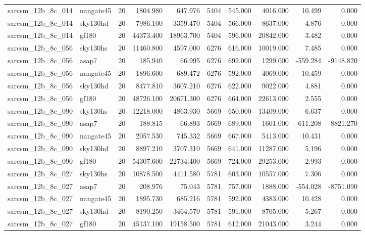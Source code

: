 \begin{tabular}{llrrrrrrrr}
sarcsm\_12b\_8c\_014 & nangate45 & 20 & 1804.980 & 647.976 & 5404 & 545.000 & 4016.000 & 10.499 & 0.000 \\
sarcsm\_12b\_8c\_014 & sky130hd & 20 & 7986.100 & 3359.470 & 5404 & 566.000 & 8637.000 & 4.876 & 0.000 \\
sarcsm\_12b\_8c\_014 & gf180 & 20 & 44373.400 & 18963.700 & 5404 & 596.000 & 20842.000 & 3.482 & 0.000 \\
sarcsm\_12b\_8c\_056 & sky130hs & 20 & 11460.800 & 4597.000 & 6276 & 616.000 & 10019.000 & 7.485 & 0.000 \\
sarcsm\_12b\_8c\_056 & asap7 & 20 & 185.940 & 66.995 & 6276 & 692.000 & 1299.000 & -559.284 & -9148.820 \\
sarcsm\_12b\_8c\_056 & nangate45 & 20 & 1896.600 & 689.472 & 6276 & 592.000 & 4069.000 & 10.459 & 0.000 \\
sarcsm\_12b\_8c\_056 & sky130hd & 20 & 8477.810 & 3607.210 & 6276 & 622.000 & 9022.000 & 4.881 & 0.000 \\
sarcsm\_12b\_8c\_056 & gf180 & 20 & 48726.100 & 20671.300 & 6276 & 664.000 & 22613.000 & 2.555 & 0.000 \\
sarcsm\_12b\_8c\_090 & sky130hs & 20 & 12218.000 & 4863.930 & 5669 & 650.000 & 13409.000 & 6.637 & 0.000 \\
sarcsm\_12b\_8c\_090 & asap7 & 20 & 188.815 & 66.893 & 5669 & 689.000 & 1601.000 & -611.208 & -8821.270 \\
sarcsm\_12b\_8c\_090 & nangate45 & 20 & 2057.530 & 745.332 & 5669 & 667.000 & 5413.000 & 10.431 & 0.000 \\
sarcsm\_12b\_8c\_090 & sky130hd & 20 & 8897.210 & 3707.310 & 5669 & 641.000 & 11287.000 & 5.196 & 0.000 \\
sarcsm\_12b\_8c\_090 & gf180 & 20 & 54307.600 & 22734.400 & 5669 & 724.000 & 29253.000 & 2.993 & 0.000 \\
sarcsm\_12b\_8c\_027 & sky130hs & 20 & 10878.500 & 4411.580 & 5781 & 603.000 & 10557.000 & 7.306 & 0.000 \\
sarcsm\_12b\_8c\_027 & asap7 & 20 & 208.976 & 75.043 & 5781 & 757.000 & 1888.000 & -554.028 & -8751.090 \\
sarcsm\_12b\_8c\_027 & nangate45 & 20 & 1895.730 & 685.216 & 5781 & 592.000 & 4383.000 & 10.428 & 0.000 \\
sarcsm\_12b\_8c\_027 & sky130hd & 20 & 8190.250 & 3464.570 & 5781 & 591.000 & 8705.000 & 5.267 & 0.000 \\
sarcsm\_12b\_8c\_027 & gf180 & 20 & 45137.100 & 19158.500 & 5781 & 612.000 & 21043.000 & 3.244 & 0.000 \\

\end{tabular}
